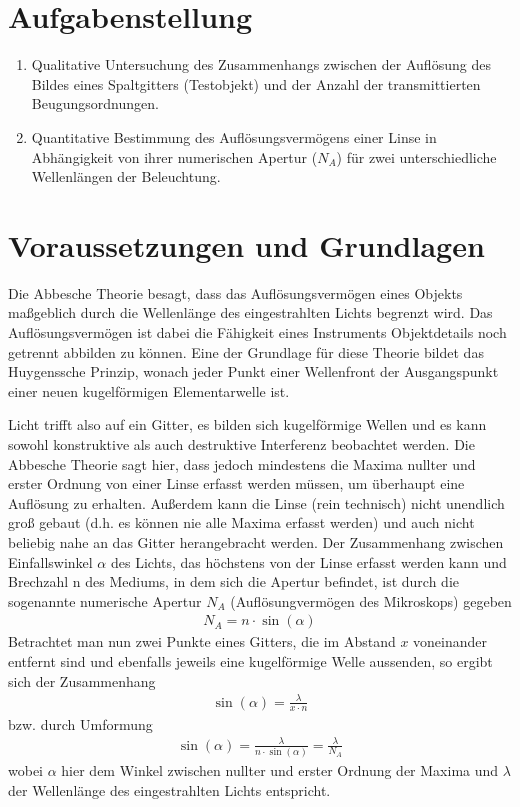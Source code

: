 \documentclass{article}
\begin{document}
\parindent0cm




\pagestyle{fancy}

\section{Aufgabenstellung}

\begin{enumerate}
\item Qualitative  Untersuchung des Zusammenhangs zwischen der  Auflösung  des  Bildes  eines Spaltgitters (Testobjekt) und der Anzahl der transmittierten Beugungsordnungen.
\item Quantitative Bestimmung  des Auflösungsvermögens  einer  Linse  in Abhängigkeit  von  ihrer numerischen Apertur ($N_A$) für zwei unterschiedliche Wellenlängen der Beleuchtung.
\end{enumerate}


\section{Voraussetzungen und Grundlagen}

Die Abbesche Theorie besagt, dass das Auflösungsvermögen eines Objekts maßgeblich durch die Wellenlänge des eingestrahlten Lichts begrenzt wird. Das Auflösungsvermögen ist dabei die Fähigkeit eines Instruments Objektdetails noch getrennt abbilden zu können. Eine der Grundlage für diese Theorie bildet das Huygenssche Prinzip, wonach jeder Punkt einer Wellenfront der Ausgangspunkt einer neuen kugelförmigen Elementarwelle ist.

Licht trifft also auf ein Gitter, es bilden sich kugelförmige Wellen und es kann sowohl konstruktive als auch destruktive Interferenz beobachtet werden. Die Abbesche Theorie sagt hier, dass jedoch mindestens die Maxima nullter und erster Ordnung von einer Linse erfasst werden müssen, um überhaupt eine Auflösung zu erhalten. Außerdem kann die Linse (rein technisch) nicht unendlich groß gebaut (d.h. es können nie alle Maxima erfasst werden) und auch nicht beliebig nahe an das Gitter herangebracht werden. Der Zusammenhang zwischen Einfallswinkel $\alpha$ des Lichts, das höchstens von der Linse erfasst werden kann und Brechzahl n des Mediums, in dem sich die Apertur befindet, ist durch die sogenannte numerische Apertur $N_A$ (Auflösungvermögen des Mikroskops) gegeben
\begin{align}
N_A = n\cdot\sin(\alpha)
\end{align}
Betrachtet man nun zwei Punkte eines Gitters, die im Abstand $x$ voneinander entfernt sind und ebenfalls jeweils eine kugelförmige Welle aussenden, so ergibt sich der Zusammenhang
\begin{align}
\sin(\alpha) = \frac{\lambda}{x\cdot n}
\end{align}
bzw. durch Umformung
\begin{align}
\sin(\alpha) = \frac{\lambda}{n\cdot \sin(\alpha)} = \frac{\lambda}{N_A} 
\end{align}
wobei $\alpha$ hier dem Winkel zwischen nullter und erster Ordnung der Maxima und $\lambda$ der Wellenlänge des eingestrahlten Lichts entspricht. \cite{quelle1} \cite{quelle2} \cite{quelle3} 
\end{document}
